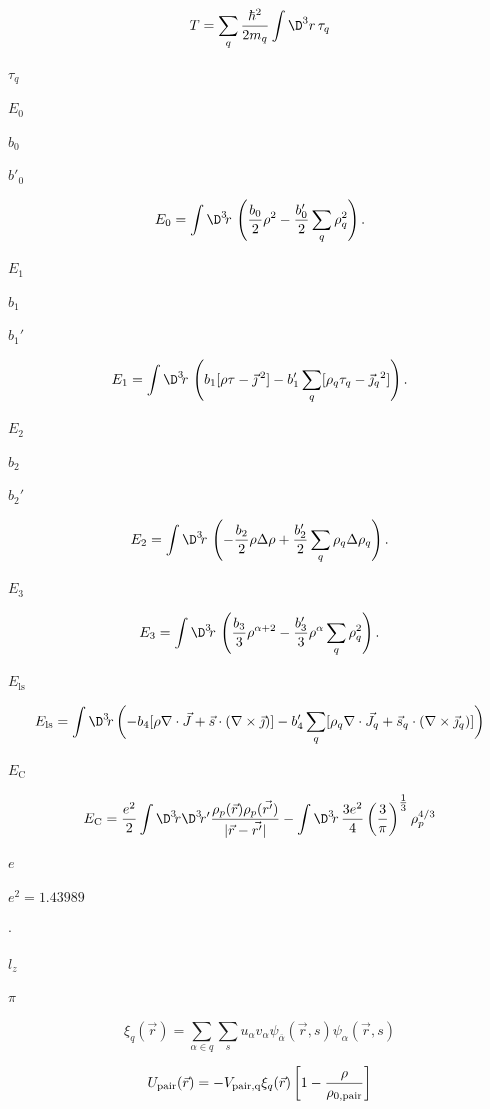 \documentclass{article}
\begin{document}
\[ T=\sum_q \frac{\hbar^2}{2m_q}\int\D^3 r\, \tau_q \]
\pagebreak

$ \tau_q $
\pagebreak

$ E_0 $
\pagebreak

$ b_0 $
\pagebreak

$ b'_0 $
\pagebreak

\[ E_0=\int \D^3\!r\,\left(\frac{b_0}{2}\rho^2-\frac{b_0'}{2}\sum_q\rho_q^2\right). \]
\pagebreak

$ E_{1}$
\pagebreak

$ b_1 $
\pagebreak

$ b_1' $
\pagebreak

\[ E_1=\int \D^3\!r\,\left(b_1[\rho\tau-{\vec\jmath\,}{}^2] -b_1'\sum_q[\rho_q\tau_q-{\vec\jmath_q}{}^2]\right).\]
\pagebreak

$ E_{2} $
\pagebreak

$ b_2 $
\pagebreak

$ b_2' $
\pagebreak

\[ E_2=\int \D^3\!r\,\left(-\frac{b_2}{2}\rho\Delta\rho +\frac{b_2'}{2}\sum_q\rho_q\Delta\rho_q\right). \]
\pagebreak

$ E_{3} $
\pagebreak

\[ E_{3}=\int \D^3\!r\,\left(\frac{b_3}{3}\rho^{\alpha+2} -\frac{b_3'}{3}\rho^\alpha\sum_q\rho_q^2\right). \]
\pagebreak

$ E_\mathrm{ls} $
\pagebreak

\[ E_\mathrm{ls}=\int \D^3\!r\,\biggl( -b_4[\rho\nabla\cdot\vec J+ \vec s\cdot(\nabla\times\vec\jmath)]-b_4'\sum_q[\rho_q\nabla\cdot\vec J_q+ \vec s_q\cdot(\nabla\times\vec\jmath_q)]\biggr) \]
\pagebreak

$ E_\mathrm{C} $
\pagebreak

\[ E_\mathrm{C} = \frac{e^2}{2}\int \D^3\!r \D^3\!r' \frac{\rho_p(\vec{r})\rho_p(\vec{r'})}{|\vec{r}-\vec{r'}|} -\int \D^3\!r\,\frac{3e^2}{4}\left(\frac3{\pi}\right)^{\tfrac1{3}}\rho_p^{4/3} \]
\pagebreak

$ e $
\pagebreak

$ e^2=1.43989 $
\pagebreak

$ \cdot $
\pagebreak

$ l_z $
\pagebreak

$ \pi $
\pagebreak

\[ \xi_q(\vec r) = \sum_{\alpha\in q} \sum_{s} u_{\alpha} v_{\alpha} \psi_{\overline{\alpha}}(\vec{r},s)\psi_{\alpha}(\vec{r},s) \]
\pagebreak

\[ U_{\rm pair}(\vec r)=-V_\mathrm{pair,q} \xi_q(\vec r) \left[1 -\frac{\rho}{\rho_{0,\mathrm{pair}}}\right] \]
\pagebreak
\end{document}
